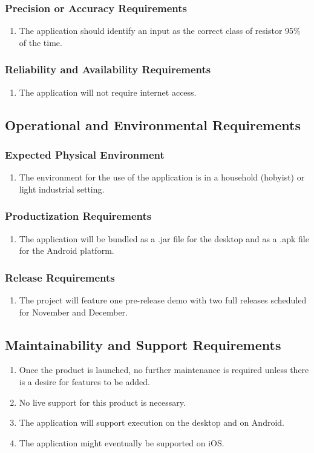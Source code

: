 \documentclass{article}
\begin{document}
\subsubsection{Precision or Accuracy Requirements}
\begin{enumerate}
\item The application should identify an input as the correct class of resistor 95\% of the time.
\end{enumerate}
\subsubsection{Reliability and Availability Requirements}
\begin{enumerate}
\item The application will not require internet access.
\end{enumerate}
\subsection{Operational and Environmental Requirements}
\subsubsection{Expected Physical Environment}
\begin{enumerate}
\item The environment for the use of the application is in a household (hobyist) or light industrial setting.
\end{enumerate}
\subsubsection{Productization Requirements}
\begin{enumerate}
\item The application will be bundled as a .jar file for the desktop and as a .apk file for the Android platform.
\end{enumerate}
\subsubsection{Release Requirements}
\begin{enumerate}
\item The project will feature one pre-release demo with two full releases scheduled for November and December.
\end{enumerate}
\subsection{Maintainability and Support Requirements}
\begin{enumerate}
\item Once the product is launched, no further maintenance is required unless there is a desire for features to be added.
\item No live support for this product is necessary.
\item The application will support execution on the desktop and on Android.
\item The application might eventually be supported on iOS.
\end{enumerate}
\end{document}
